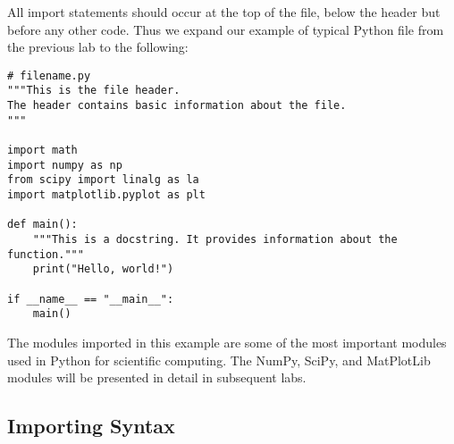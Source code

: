 All import statements should occur at the top of the file, below the header but before any other code.
Thus we expand our example of typical Python file from the previous lab to the following:

\begin{lstlisting}
# filename.py
"""This is the file header.
The header contains basic information about the file.
"""

import math
import numpy as np
from scipy import linalg as la
import matplotlib.pyplot as plt

def main():
    """This is a docstring. It provides information about the function."""
    print("Hello, world!")

if __name__ == "__main__":
    main()
\end{lstlisting}

The modules imported in this example are some of the most important modules used in Python for scientific computing.
The NumPy, SciPy, and MatPlotLib modules will be presented in detail in subsequent labs.

\subsection*{Importing Syntax} %

